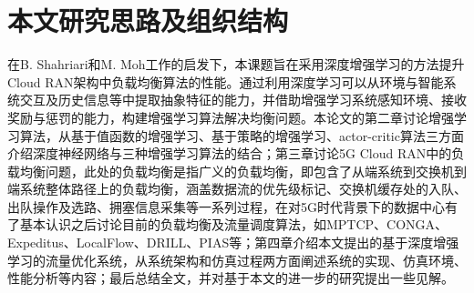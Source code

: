 \section{本文研究思路及组织结构}
在B. Shahriari和M. Moh工作的启发下，本课题旨在采用深度增强学习的方法提升Cloud RAN架构中负载均衡算法的性能。通过利用深度学习可以从环境与智能系统交互及历史信息等中提取抽象特征的能力，并借助增强学习系统感知环境、接收奖励与惩罚的能力，构建增强学习算法解决均衡问题。本论文的第二章讨论增强学习算法，从基于值函数的增强学习、基于策略的增强学习、actor-critic算法三方面介绍深度神经网络与三种增强学习算法的结合；第三章讨论5G Cloud RAN中的负载均衡问题，此处的负载均衡是指广义的负载均衡，即包含了从端系统到交换机到端系统整体路径上的负载均衡，涵盖数据流的优先级标记、交换机缓存处的入队、出队操作及选路、拥塞信息采集等一系列过程，在对5G时代背景下的数据中心有了基本认识之后讨论目前的负载均衡及流量调度算法，如MPTCP、CONGA、Expeditus、LocalFlow、DRILL、PIAS等；第四章介绍本文提出的基于深度增强学习的流量优化系统，从系统架构和仿真过程两方面阐述系统的实现、仿真环境、性能分析等内容；最后总结全文，并对基于本文的进一步的研究提出一些见解。